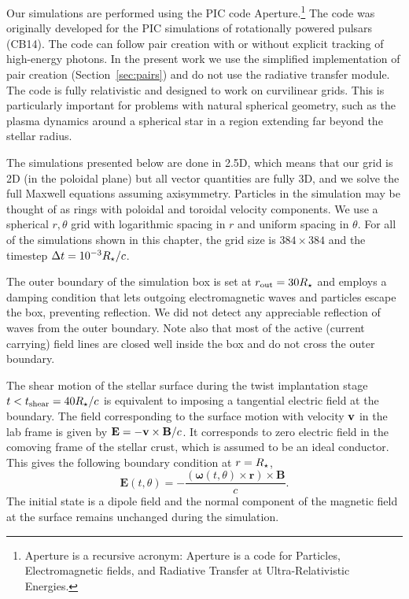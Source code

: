 Our simulations are performed using the PIC code Aperture.\footnote{Aperture is
  a recursive acronym:
  Aperture is a code for Particles, Electromagnetic
  fields, and Radiative Transfer at Ultra-Relativistic Energies.} The code was
originally developed for the PIC simulations of rotationally powered pulsars
(CB14). The code can follow pair creation with or without explicit tracking of
high-energy photons. In the present work we use the simplified implementation of
pair creation (Section~\ref{sec:pairs}) and do not use the radiative transfer
module. The code is fully relativistic and designed to work on curvilinear
grids. This is particularly important for problems with natural spherical
geometry, such as the plasma dynamics around a spherical star in a region
extending far beyond the stellar radius.

The simulations presented below are done in 2.5D, which means that our grid is
2D (in the poloidal plane) but all vector quantities are fully 3D, and we solve
the full Maxwell equations assuming axisymmetry. Particles in the simulation may
be thought of as rings with poloidal and toroidal velocity components. We use a
spherical $r,\theta$ grid with logarithmic spacing in $r$ and uniform spacing in
$\theta$. For all of the simulations shown in this chapter, the grid size is
$384\times 384$ and the timestep $\Delta t = 10^{-3}R_\star/c$.

The outer boundary of the simulation box is set at $r_{\rm out} = 30R_\star$ and employs
a damping condition that lets outgoing electromagnetic waves and particles escape
the box, preventing reflection.
We did not detect any appreciable reflection of waves from the outer boundary.
Note also that most of the active (current carrying) field lines are
closed well inside the box and do not cross the outer boundary.

The shear motion of the stellar surface during the twist implantation stage
$t<t_{\rm shear}=40R_\star/c$ is equivalent to imposing a tangential electric field at the
boundary. The field corresponding to the surface motion with velocity ${\mathbf v}$ in
the lab frame is given by ${\mathbf E}=-{\mathbf v}\times{\mathbf B}/c$. It corresponds to zero electric
field in the comoving frame of the stellar crust, which is assumed to be an
ideal conductor. This gives the following boundary condition at $r=R_\star$,
\begin{equation}
  \label{eq:4}
  \mathbf{E}(t,\theta) =
  -\frac{( \mathbf{\omega}(t,\theta)\times \mathbf{r})\times \mathbf{B}}{c}.
\end{equation}
The initial state is a dipole field and the normal component of the magnetic field
at the surface remains unchanged during the simulation.


